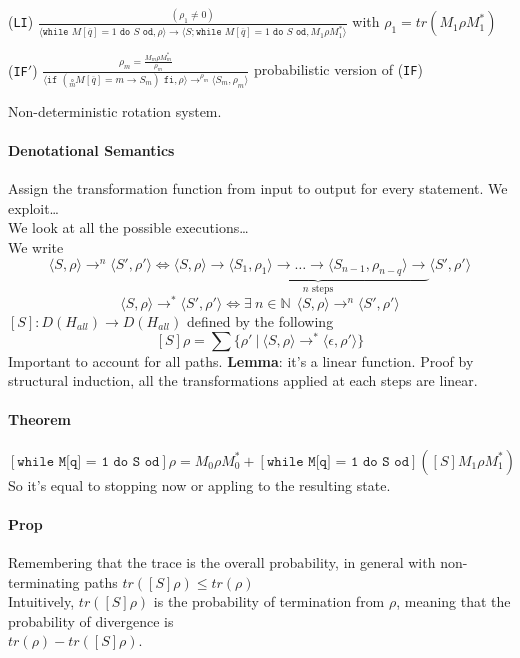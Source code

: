 \documentclass[10pt]{report}
\begin{document}
\begin{list}{}{}
	\item[(\texttt{LI})] $\frac{\displaystyle(\rho_1\neq 0)}{\displaystyle\langle\texttt{while }M[\overline{q}]=1\texttt{ do }S\texttt{ od},\rho\rangle\rightarrow\langle S;\texttt{while }M[\overline{q}]=1\texttt{ do }S\texttt{ od},M_1\rho M_1^*\rangle}$ with $\rho_1 = tr(M_1\rho M_1^*)$
	\item[(\texttt{IF$'$})] 
	$\frac{\displaystyle\rho_m=\frac{M_m\rho M_m^*}{\rho_m}}{\displaystyle\langle\texttt{if }(\underset{m}{\square}M[\overline{q}]=m\rightarrow S_m)\texttt{ fi}, \rho\rangle\rightarrow^{\rho_m}\langle S_m,\rho_m\rangle}$ probabilistic version of (\texttt{IF})
\end{list}
Non-deterministic rotation system.
\paragraph{Denotational Semantics} Assign the transformation function from input to output for every statement. We exploit\ldots\\ %
We look at all the possible executions\ldots\\ %
We write $$\langle S,\rho\rangle\rightarrow^n\langle S', \rho'\rangle \Leftrightarrow \langle S,\rho\rangle\underset{n\text{ steps}}{\underbrace{\rightarrow \langle S_1,\rho_1\rangle\rightarrow\ldots\rightarrow\langle S_{n-1},\rho_{n-q}\rangle\rightarrow}}\langle S',\rho'\rangle$$
$$\langle S,\rho\rangle\rightarrow^*\langle S',\rho'\rangle\Leftrightarrow\exists\:n\in\mathbb{N}\:\:\langle S,\rho\rangle\rightarrow^n\langle S',\rho'\rangle$$
$[S] : D(H_{all})\rightarrow D(H_{all})$ defined by the following
$$[S]\rho =\sum\{\rho'\:|\:\langle S,\rho\rangle\rightarrow^*\langle\epsilon,\rho'\rangle\}$$
Important to account for all paths. \textbf{Lemma}: it's a linear function. Proof by structural induction, all the transformations applied at each steps are linear.
\paragraph{Theorem} $[\texttt{while M[q] = 1 do S od}]\rho = M_0\rho M_0^* + [\texttt{while M[q] = 1 do S od}]([S]M_1\rho M_1^*)$\\
So it's equal to stopping now or appling to the resulting state.
\paragraph{Prop} Remembering that the trace is the overall probability, in general with non-terminating paths $tr([S]\rho) \leq tr(\rho)$\\
Intuitively, $tr([S]\rho)$ is the probability of termination from $\rho$, meaning that the probability of divergence is\\$tr(\rho)-tr([S]\rho)$.
\end{document}
